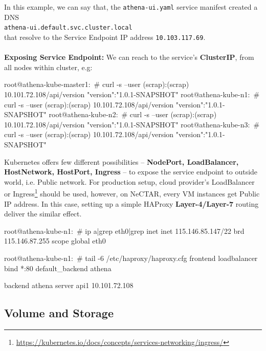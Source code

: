 \noindent In this example, we can say that, the \verb|athena-ui.yaml| service manifest created a DNS
\\
\verb|athena-ui.default.svc.cluster.local|
\\
that resolve to the Service Endpoint IP address \verb|10.103.117.69|.
\\
\\
\noindent \textbf{Exposing Service Endpoint:} \quad We can reach to the service's \textbf{ClusterIP}, from all nodes within cluster, e.g:

\begin{small}
\begin{lcverbatim}
root@athena-kube-master1:~# curl -s --user (scrap):(scrap) 10.101.72.108/api/version
{"version":"1.0.1-SNAPSHOT"}
root@athena-kube-n1:~# curl -s --user (scrap):(scrap) 10.101.72.108/api/version
{"version":"1.0.1-SNAPSHOT"}
root@athena-kube-n2:~# curl -s --user (scrap):(scrap) 10.101.72.108/api/version
{"version":"1.0.1-SNAPSHOT"}
root@athena-kube-n3:~# curl -s --user (scrap):(scrap) 10.101.72.108/api/version
{"version":"1.0.1-SNAPSHOT"}
\end{lcverbatim}
\end{small}

\noindent Kubernetes offers few different possibilities -- \textbf{NodePort, LoadBalancer, HostNetwork, HostPort, Ingress} -- to expose the service endpoint to outside world, i.e. Public network. For production setup, cloud provider's LoadBalancer or Ingress\footnote{\url{https://kubernetes.io/docs/concepts/services-networking/ingress/}} should be used, however, on NeCTAR, every VM instances get Public IP address. In this case, setting up a simple HAProxy \textbf{Layer-4/Layer-7} routing deliver the similar effect.

\begin{small}
\begin{lcverbatim}
root@athena-kube-n1:~# ip a|grep eth0|grep inet
    inet 115.146.85.147/22 brd 115.146.87.255 scope global eth0

root@athena-kube-n1:~# tail -6 /etc/haproxy/haproxy.cfg
frontend loadbalancer
	bind *:80
	default_backend athena

backend athena
	server api1 10.101.72.108
\end{lcverbatim}
\end{small}

\subsection{Volume and Storage}

